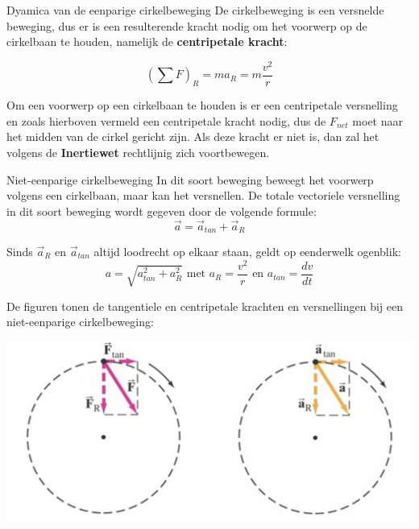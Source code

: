 \begin{theo}{Dyamica van de eenparige cirkelbeweging}
    De cirkelbeweging is een versnelde beweging, dus er is een resulterende kracht nodig om het voorwerp op de cirkelbaan te houden, namelijk de \textbf{centripetale kracht}:

    \begin{equation*}
        (\sum F)_R = ma_R = m\dfrac{v^2}{r}
    \end{equation*}
    
    \noindent Om een voorwerp op een cirkelbaan te houden is er een centripetale versnelling en zoals hierboven vermeld een centripetale kracht nodig, dus de $ F_{net} $ moet naar het midden van de cirkel gericht zijn. Als deze kracht er niet is, dan zal het volgens de \textbf{Inertiewet} rechtlijnig zich voortbewegen.
\end{theo}
 
\begin{theo}{Niet-eenparige cirkelbeweging}
    In dit soort beweging beweegt het voorwerp volgens een cirkelbaan, maar kan het versnellen. De totale vectoriele versnelling in dit soort beweging wordt gegeven door de volgende formule:
    \begin{equation*}
        \Vec{a} = \Vec{a}_{tan} + \Vec{a}_R 
    \end{equation*}

    \noindent Sinds $ \Vec{a}_R $ en $ \Vec{a}_{tan} $ altijd loodrecht op elkaar staan, geldt op eenderwelk ogenblik:
        \begin{equation*}
            a = \sqrt{a_{tan}^2 + a_R^2} \text{ met } a_R = \dfrac{v^2}{r} \text{ en } a_{tan} = \dfrac{dv}{dt}
        \end{equation*}

    \noindent De figuren tonen de tangentiele en centripetale krachten en versnellingen bij een niet-eenparige cirkelbeweging:
    
        \begin{center}
            \includegraphics[scale = 0.20]{Images/Dynamica/Niet-Eenparige Cirkelbeweging.png} 
        \end{center}
\end{theo}

